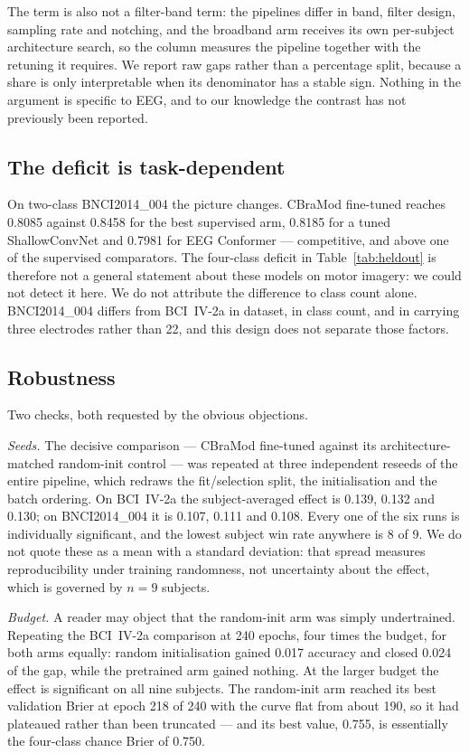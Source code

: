 The term is also not a filter-band term: the pipelines differ in band, filter
design, sampling rate and notching, and the broadband arm receives its own
per-subject architecture search, so the column measures the pipeline together
with the retuning it requires. We report raw gaps rather than a percentage
split, because a share is only interpretable when its denominator has a stable
sign. Nothing in the argument is specific to EEG, and to our knowledge the
contrast has not previously been reported.

\subsection{The deficit is task-dependent}
On two-class BNCI2014\_004 the picture changes. CBraMod fine-tuned reaches
0.8085 against 0.8458 for the best supervised arm, 0.8185 for a tuned
ShallowConvNet and 0.7981 for EEG Conformer --- competitive, and above one of
the supervised comparators. The four-class deficit in Table~\ref{tab:heldout}
is therefore not a general statement about these models on motor imagery: we
could not detect it here. We do not attribute the difference to class count
alone. BNCI2014\_004 differs from BCI~IV-2a in dataset, in class count, and in
carrying three electrodes rather than 22, and this design does not separate
those factors.

\subsection{Robustness}
Two checks, both requested by the obvious objections.

\emph{Seeds.} The decisive comparison --- CBraMod fine-tuned against its
architecture-matched random-init control --- was repeated at three independent
reseeds of the entire pipeline, which redraws the fit/selection split, the
initialisation and the batch ordering. On BCI~IV-2a the subject-averaged effect
is 0.139, 0.132 and 0.130; on BNCI2014\_004 it is 0.107, 0.111 and 0.108. Every
one of the six runs is individually significant, and the lowest subject win
rate anywhere is 8 of 9. We do not quote these as a mean with a standard
deviation: that spread measures reproducibility under training randomness, not
uncertainty about the effect, which is governed by $n=9$ subjects.

\emph{Budget.} A reader may object that the random-init arm was simply
undertrained. Repeating the BCI~IV-2a comparison at 240 epochs, four times the
budget, for both arms equally: random initialisation gained 0.017 accuracy and
closed 0.024 of the gap, while the pretrained arm gained nothing. At the larger
budget the effect is significant on all nine subjects. The random-init arm reached its best
validation Brier at epoch 218 of 240 with the curve flat from about 190, so it
had plateaued rather than been truncated --- and its best value, 0.755, is
essentially the four-class chance Brier of 0.750.

